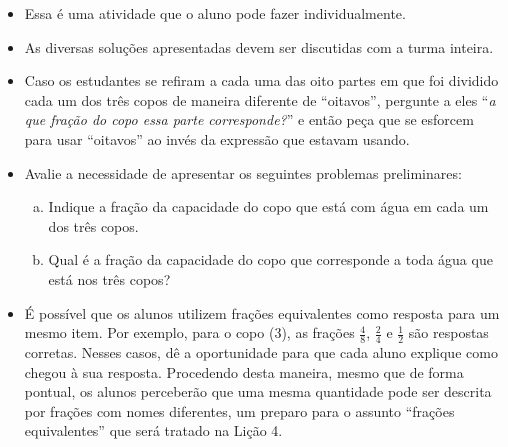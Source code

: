 \begin{orientacoes}
    \begin{itemize} %
    \item Essa é uma atividade que o aluno pode fazer individualmente.
    \item As diversas soluções apresentadas devem ser discutidas com a turma inteira.
    \item Caso os estudantes se refiram a cada uma das oito partes em que foi dividido cada um dos três copos de maneira diferente de ``oitavos'', pergunte a eles ``\textit{a que fração do copo essa parte corresponde?}'' e então peça que se esforcem para usar ``oitavos'' ao invés da expressão que estavam usando.
    \item Avalie a necessidade de apresentar os seguintes problemas preliminares:
      \begin{enumerate}[a)]
      \item Indique a fração da capacidade do copo que está com água em cada um dos três copos.
      \item Qual é a fração da capacidade do copo que corresponde a toda água que está nos três copos?
      \end{enumerate}
    \item É possível que os alunos utilizem frações equivalentes como resposta para um mesmo item. Por exemplo, para o copo (3), as frações       $\frac{4}{8}$,       $\frac{2}{4}$ e       $\frac{1}{2}$ são respostas corretas. Nesses casos, dê a oportunidade para que cada aluno explique como chegou à sua resposta. Procedendo desta maneira, mesmo que de forma pontual, os alunos perceberão que uma mesma quantidade pode ser descrita por frações com nomes diferentes, um preparo para o assunto       ``frações equivalentes''     que será tratado na Lição 4.
\end{itemize} %


\end{orientacoes}

